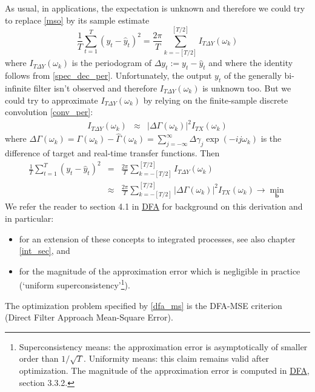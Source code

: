 \documentclass[a4paper]{book}
\begin{document}
As usual, in applications, the expectation is unknown and therefore we could try to replace \ref{mso} by its sample estimate
\begin{equation}\label{s_dfa}
\frac{1}{T}\sum_{t=1}^T (y_{t}-\hat{y}_{t})^2=\frac{2\pi}{T}\sum_{k=-[T/2]}^{[T/2]}I_{T\Delta Y}(\omega_k)
\end{equation}
where $I_{T\Delta Y}(\omega_k)$ is the periodogram of $\Delta y_t:=y_{t}-\hat{y}_{t}$ and where the identity follows from \ref{spec_dec_per}.
Unfortunately, the output $y_t$ of the generally bi-infinite filter isn't observed and therefore $I_{T\Delta Y}(\omega_k)$ is unknown too.
But we could try to approximate $I_{T\Delta Y}(\omega_k)$ by relying on the finite-sample discrete convolution \ref{conv_per}:
\begin{eqnarray*}
I_{T\Delta Y}(\omega_k)&\approx& \left|\Delta \Gamma(\omega_k) \right|^2I_{TX}(\omega_k)
\end{eqnarray*}
where $\Delta \Gamma(\omega_k)=\Gamma(\omega_k)-\hat{\Gamma}(\omega_k)=\sum_{j=-\infty}^{\infty}\Delta\gamma_j\exp(-ij\omega_k)$
is the difference of target and real-time transfer functions. Then
\begin{eqnarray}
\frac{1}{T}\sum_{t=1}^T (y_{t}-\hat{y}_{t})^2&=&\frac{2\pi}{T}\sum_{k=-[T/2]}^{[T/2]}I_{T\Delta Y}(\omega_k)\label{s_dfa_e}\\
&\approx&\frac{2\pi}{T}\sum_{k=-[T/2]}^{[T/2]}\left|\Delta\Gamma(\omega_k) \right|^2 I_{TX}(\omega_k)\to\min_{\mathbf{b}} \label{dfa_ms}
\end{eqnarray}
We refer the reader to section 4.1 in \href{http://blog.zhaw.ch/sef/files/2014/10/DFA.pdf}{DFA} for background  on this derivation and in particular: 
\begin{itemize}
\item for an extension of these concepts to integrated processes, see also chapter \ref{int_sec}, and
\item for the magnitude of the approximation error which is negligible in practice (`uniform superconsistency'\footnote{Superconsistency means: the approximation error is asymptotically of smaller order than $1/\sqrt{T}$. Uniformity means: this claim remains valid after optimization. The magnitude of the approximation error is computed in \href{http://blog.zhaw.ch/sef/files/2014/10/DFA.pdf}{DFA}, section 3.3.2.}).
\end{itemize} 
The optimization problem specified by \ref{dfa_ms} is the DFA-MSE criterion (Direct Filter Approach Mean-Square Error). \\
\end{document}
